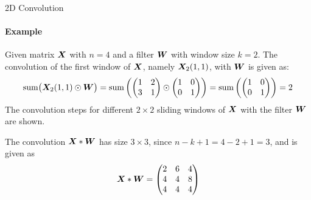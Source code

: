 \begin{frame}{2D Convolution}
\framesubtitle{Example}
Given  matrix ${\boldsymbol X}$ with $n=4$ and a
    filter ${\boldsymbol W}$ with window size $k=2$. The convolution of the 
    first window of ${\boldsymbol X}$, namely ${\boldsymbol X}_2(1,1)$, with ${\boldsymbol W}$
    is given as: %
    \begin{align*}
        \operatorname*{sum}\bigl({\boldsymbol X}_2(1,1) \odot {\boldsymbol W}\bigr) = 
        \operatorname*{sum}\left(
            \begin{pmatrix} 1 & 2\\3 & 1 \end{pmatrix} \odot \begin{pmatrix} 1 & 0\\0 & 1 \end{pmatrix}
        \right) = 
        \operatorname*{sum}\left( \begin{pmatrix} 1 & 0\\0& 1 \end{pmatrix}\right)  = 2
    \end{align*}
    The convolution steps for different $2\times 2$ 
    sliding windows of ${\boldsymbol X}$ with the
    filter ${\boldsymbol W}$ are shown.

	\medskip

    The convolution ${\boldsymbol X} \ast {\boldsymbol W}$ has size $3 \times 3$, since 
    $n-k+1 = 4-2+1 = 3$, and is
    given as 
\[        {\boldsymbol X} \ast {\boldsymbol W} = \begin{pmatrix} 2 & 6 & 4\\
            4 & 4 & 8\\
            4 & 4 & 4
     \end{pmatrix} \]
\end{frame}
